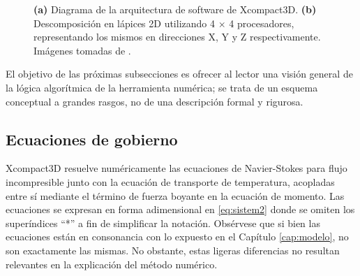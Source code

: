 \begin{figure}[H]
 \centering
    
 \caption{\textbf{(a)} Diagrama de la arquitectura de software de Xcompact3D. \textbf{(b)} Descomposición en lápices 2D utilizando 4 $\times$ 4 procesadores, representando los mismos en direcciones X, Y y Z respectivamente. Imágenes tomadas de \cite{bartholomew2020xcompact3d}.} 
 \label{fig:xc3d}
\end{figure}

El objetivo de las próximas subsecciones es ofrecer al lector una visión general de la lógica algorítmica de la herramienta numérica; se trata de un esquema conceptual a grandes rasgos, no de una descripción formal y rigurosa.

\subsection{Ecuaciones de gobierno}

Xcompact3D resuelve numéricamente las ecuaciones de Navier-Stokes para flujo incompresible junto con la ecuación de transporte de temperatura, acopladas entre sí mediante el término de fuerza boyante en la ecuación de momento. Las ecuaciones se expresan en forma adimensional en \ref{eq:sistem2} donde se omiten los superíndices ``*'' a fin de simplificar la notación. {\linebreak}Obsérvese que si bien las ecuaciones están en consonancia con lo expuesto en el Capítulo \ref{cap:modelo}, no son exactamente las mismas. No obstante, estas ligeras diferencias no resultan relevantes en la explicación del método numérico.

